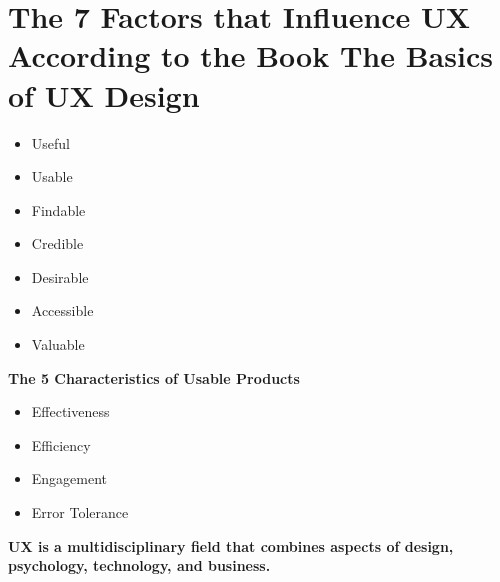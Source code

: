 \documentclass[12pt,oneside]{article}
\begin{document}
\section{The 7 Factors that Influence UX According to the Book The Basics of UX Design}
\begin{itemize}
\item Useful
\item Usable
\item Findable
\item Credible
\item Desirable
\item Accessible
\item Valuable
\end{itemize}
\textbf{The 5 Characteristics of Usable Products}
\begin{itemize}
\item Effectiveness
\item Efficiency
\item Engagement
\item Error Tolerance
 
\end{itemize}
\textbf{UX is a multidisciplinary field that combines aspects of design, psychology, technology, and business.}  
\printbibliography
 
\end{document}
